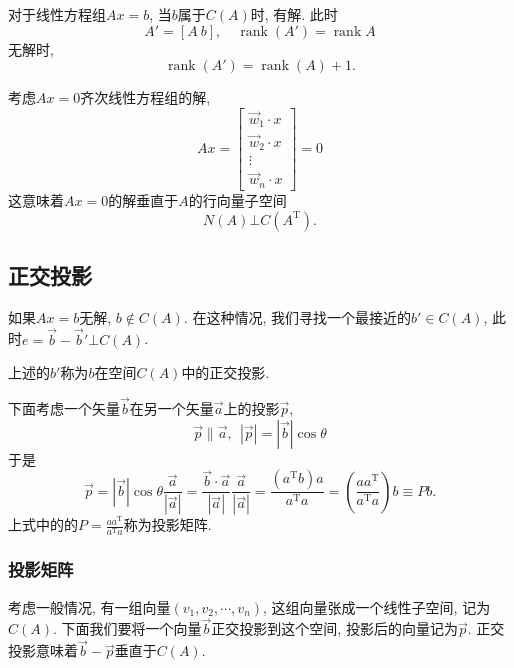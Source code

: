 对于线性方程组$Ax=b$, 当$b$属于$C(A)$时, 有解. 此时
\begin{equation}
  A'= [A\  b], \quad \operatorname{rank}(A')=\operatorname{rank}A
\end{equation}
无解时, 
\begin{equation}
  \operatorname{rank}(A')=\operatorname{rank}(A)+1.
\end{equation}

考虑$Ax=0$齐次线性方程组的解, 
\begin{equation}
  Ax = \begin{bmatrix} 
  \vec{w}_1\cdot x \\ 
  \vec{w}_2\cdot x \\ 
  \vdots \\ 
  \vec{w}_n\cdot x 
  \end{bmatrix}=0
\end{equation}
这意味着$Ax=0$的解垂直于$A$的行向量子空间
\begin{equation}
  N(A)\bot C(A^{\mathrm{T}}).
\end{equation}

\subsection{正交投影}

如果$Ax=b$无解, $b \notin C(A)$. 在这种情况, 我们寻找一个最接近的$b' \in C(A)$, 此时$e=\vec{b}-\vec{b}' \bot C(A)$.
\begin{definition}
    上述的$b'$称为$b$在空间$C(A)$中的正交投影.
\end{definition}

\begin{example}
    下面考虑一个矢量$\vec{b}$在另一个矢量$\vec{a}$上的投影$\vec{p}$,
    \begin{equation}
      \vec{p} \parallel \vec{a} ,\ \  |\vec{p}| = |\vec{b}| \cos \theta
    \end{equation}
    于是
    \begin{equation}
      \vec{p} = |\vec{b}|\cos\theta \frac{\vec{a}}{|\vec{a}|} =\frac{\vec{b}\cdot \vec{a}}{|\vec{a}|} \frac{\vec{a}}{|\vec{a}|}= \frac{\left( a^{\mathrm{T}}b \right) a}{a^{\mathrm{T}}a} = \left( \frac{a a^{\mathrm{T}}}{a^{\mathrm{T}} a} \right) b \equiv  P b.
    \end{equation}
    上式中的的$\displaystyle P= \frac{a a^{\mathrm{T}}}{a^{\mathrm{T}} a}$称为投影矩阵.
\end{example}

\subsubsection{投影矩阵}
考虑一般情况, 有一组向量$(v_1,v_2,\cdots,v_n)$, 这组向量张成一个线性子空间, 记为$C(A)$. 
下面我们要将一个向量$\vec{b}$正交投影到这个空间, 投影后的向量记为$\vec{p}$. 正交投影意味着$\vec{b}-\vec{p}$垂直于$C(A)$.

